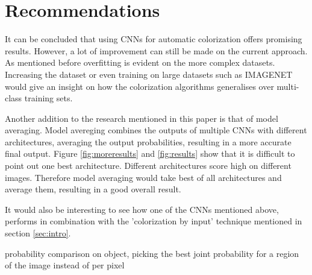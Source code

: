 \section{Recommendations}


It can be concluded that using CNNs for automatic colorization offers promising results. However, a lot of improvement can still be made on the current approach. As mentioned before overfitting is evident on the more complex datasets. Increasing the dataset or even training on large datasets such as IMAGENET \cite{deng2009imagenet} would give an insight on how the colorization algorithms generalises over multi-class training sets. 

Another addition to the research mentioned in this paper is that of model averaging. Model avereging combines the outputs of multiple CNNs with different architectures, averaging the output probabilities, resulting in a more accurate final output. Figure \ref{fig:moreresults} and \ref{fig:results} show that it is difficult to point out one best architecture. Different architectures score high on different images. Therefore model averaging would take best of all architectures and average them, resulting in a good overall result.

It would also be interesting to see how one of the CNNs mentioned above, performs in combination with the 'colorization by input' technique mentioned in section \ref{sec:intro}.


{\color{red} probability comparison on object, picking the best joint probability for a region of the image instead of per pixel}